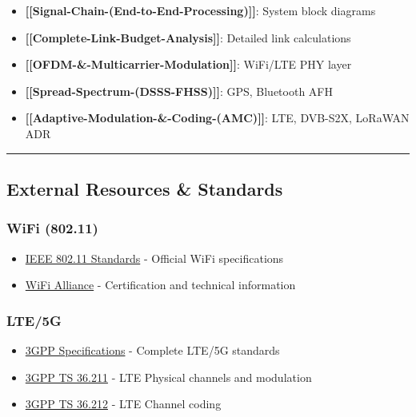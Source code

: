 \begin{itemize}
\tightlist
\item
  \textbf{{[}{[}Signal-Chain-(End-to-End-Processing){]}{]}}: System
  block diagrams
\item
  \textbf{{[}{[}Complete-Link-Budget-Analysis{]}{]}}: Detailed link
  calculations
\item
  \textbf{{[}{[}OFDM-\&-Multicarrier-Modulation{]}{]}}: WiFi/LTE PHY
  layer
\item
  \textbf{{[}{[}Spread-Spectrum-(DSSS-FHSS){]}{]}}: GPS, Bluetooth AFH
\item
  \textbf{{[}{[}Adaptive-Modulation-\&-Coding-(AMC){]}{]}}: LTE,
  DVB-S2X, LoRaWAN ADR
\end{itemize}

\begin{center}\rule{0.5\linewidth}{0.5pt}\end{center}

\subsection{External Resources \&
Standards}\label{external-resources-standards}

\subsubsection{WiFi (802.11)}\label{wifi-802.11}

\begin{itemize}
\tightlist
\item
  \href{https://standards.ieee.org/standard/802_11-2020.html}{IEEE
  802.11 Standards} - Official WiFi specifications
\item
  \href{https://www.wi-fi.org/}{WiFi Alliance} - Certification and
  technical information
\end{itemize}

\subsubsection{LTE/5G}\label{lte5g}

\begin{itemize}
\tightlist
\item
  \href{https://www.3gpp.org/ftp/Specs/archive/}{3GPP Specifications} -
  Complete LTE/5G standards
\item
  \href{https://www.3gpp.org/ftp/Specs/archive/36_series/36.211/}{3GPP
  TS 36.211} - LTE Physical channels and modulation
\item
  \href{https://www.3gpp.org/ftp/Specs/archive/36_series/36.212/}{3GPP
  TS 36.212} - LTE Channel coding
\end{itemize}

